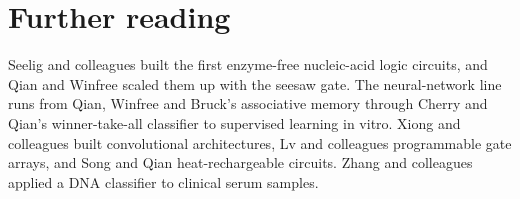 \section*{Further reading}
Seelig and colleagues built the first enzyme-free nucleic-acid logic
circuits,\cite{Seelig2006} and Qian and Winfree scaled them up with the seesaw
gate.\cite{QianWinfree2011} The neural-network line runs from Qian, Winfree and
Bruck's associative memory\cite{QianWinfreeBruck2011} through Cherry and Qian's
winner-take-all classifier\cite{CherryQian2018} to supervised learning in
vitro.\cite{CherryQian2025} Xiong and colleagues built convolutional
architectures,\cite{Xiong2022} Lv and colleagues programmable gate
arrays,\cite{Lv2023} and Song and Qian heat-rechargeable circuits.\cite{SongQian2025}
Zhang and colleagues applied a DNA classifier to clinical serum
samples.\cite{Zhang2020cancer}
